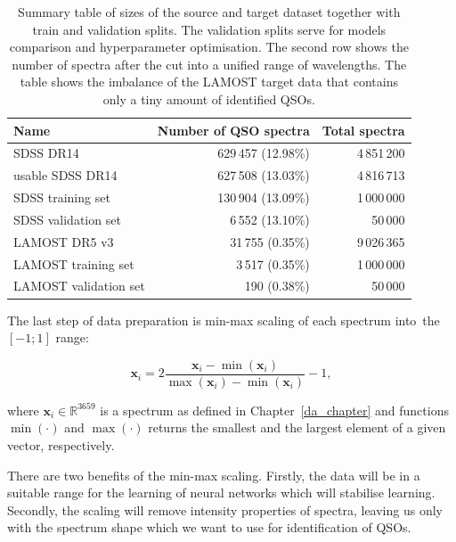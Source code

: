 \begin{table}
\begin{center}
\begin{tabular}{|l|r|r|}
	\hline
	Name & Number of QSO spectra & Total spectra \\ \hline \hline
	SDSS DR14 & 629\,457 (12.98\%) & 4\,851\,200 \\ \hline
	usable SDSS DR14 & 627\,508 (13.03\%) & 4\,816\,713 \\ \hline
	SDSS training set & 130\,904 (13.09\%) & 1\,000\,000 \\ \hline
	SDSS validation set & 6\,552 (13.10\%) & 50\,000 \\ \hline
	LAMOST DR5 v3 & 31\,755 (0.35\%) & 9\,026\,365 \\ \hline
	LAMOST training set & 3\,517 (0.35\%) & 1\,000\,000 \\ \hline
	LAMOST validation set & 190 (0.38\%) & 50\,000 \\ \hline
\end{tabular}
\end{center}
\caption[Sizes of source and target datasets]{
	Summary table of sizes of the source and target dataset
	together with train and validation splits.
	The validation splits serve for models comparison
	and hyperparameter optimisation.
	The second row shows the number of spectra
	after the cut into a unified range of wavelengths.
	The table shows the imbalance of the LAMOST target data
	that contains only a tiny amount of identified QSOs.
	}
\label{datasets_sizes}
\end{table}

The last step of data preparation is min-max scaling of each spectrum into~the~\([-1; 1]\) range:

\begin{equation}
	\mathbf{x}_i = 2 \frac{\mathbf{x}_i - \min(\mathbf{x}_i)}{
		\max(\mathbf{x}_i) - \min(\mathbf{x}_i)} - 1,
\end{equation}

where \(\mathbf{x}_i \in \mathbb{R}^{3659}\) is a spectrum as defined in Chapter~\ref{da_chapter}
and functions \(\min(\cdot)\) and \(\max(\cdot)\) returns the smallest and the largest element of a given vector, respectively.

There are two benefits of the min-max scaling.
Firstly, the data will be in a suitable range for the learning of neural networks
which will stabilise learning.
Secondly, the scaling will remove intensity properties of spectra,
leaving us only with the spectrum shape
which we want to use for identification of QSOs.


